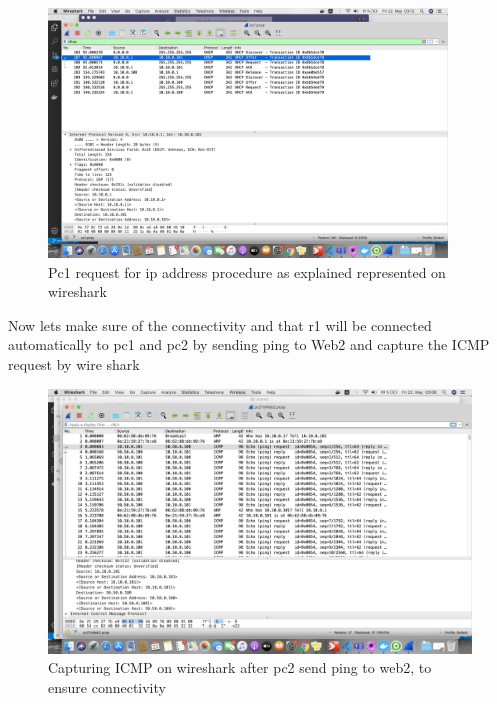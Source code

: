 \begin{figure}[H]
\centering
  \includegraphics[width=300pt]{Images/dhcpWireshark.png}
  \caption{Pc1 request for ip address procedure as explained represented on wireshark}
  \label{fig:3.5}
\end{figure}

Now lets make sure of the connectivity and that r1 will be connected automatically to pc1 and pc2 by sending ping to Web2 and capture the ICMP request by wire shark


\begin{figure}[H]
\centering
  \includegraphics[width=400pt]{Images/pc2Toweb2P3.png}
  \caption{Capturing ICMP on wireshark after pc2 send ping to web2, to ensure connectivity}
  \label{fig:3.7}
\end{figure}